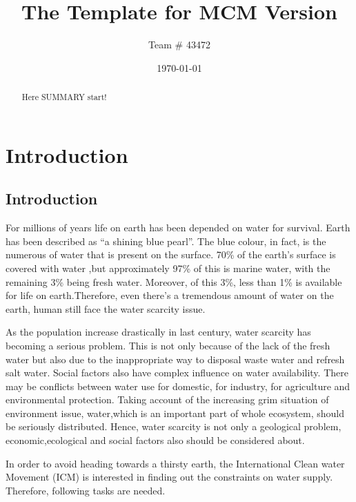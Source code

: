 \documentclass{mcmthesis}
\title{The Template for MCM Version }
\author{Team \# 43472}
\date{\today}
\begin{document}
\begin{abstract}
Here SUMMARY start!

\end{abstract}

\maketitle

\tableofcontents

\newpage

\section{Introduction}
\subsection{Introduction}

	
	 For millions of years life on earth has been depended on water for survival. Earth has been described as “a shining blue pearl”. The blue colour, in fact, is the numerous of water that is present on the surface. 70\% of the earth’s surface is covered with water ,but approximately 97\% of this is marine water, with the remaining 3\% being fresh water. Moreover, of this 3\%, less than 1\% is available for life on earth.Therefore, even there’s a tremendous amount of water on the earth, human still face the water scarcity issue.
	 
	As the population increase drastically in last century, water scarcity has becoming a serious problem. This is not only because of the lack of the fresh water but also due to the inappropriate way to disposal waste water and refresh salt water. Social factors also have complex influence on water availability. There may be conflicts between water use for domestic, for industry, for agriculture and environmental protection. Taking account of the increasing grim situation of 
environment issue, water,which is an important part of whole ecosystem, should be seriously distributed. Hence, water scarcity is not only a geological problem, economic,ecological and social factors also should be considered about. 
	
	In order to avoid heading towards a thirsty earth, the International Clean water Movement (ICM) is interested in finding out the constraints on water supply. Therefore, following tasks are needed.
\end{document}
